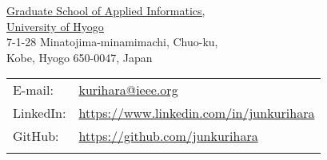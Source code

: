 {\Huge \name}


\vspace{0.25in}

\begin{minipage}{0.45\linewidth}
  \href{https://www.ai.u-hyogo.ac.jp/index.html}{Graduate School of Applied Informatics,\\ University of Hyogo} \\
  7-1-28 Minatojima-minamimachi, Chuo-ku, \\
  Kobe, Hyogo 650-0047, Japan
\end{minipage}
\begin{minipage}{0.45\linewidth}
  \begin{tabular}{ll}
    E-mail: & \href{mailto:kurihara@ieee.org}{kurihara@ieee.org} \\
    LinkedIn: & \href{https://www.linkedin.com/in/junkurihara}{https://www.linkedin.com/in/junkurihara}\\
    GitHub: & \href{https://github.com/junkurihara}{https://github.com/junkurihara}\\
    &\\
  \end{tabular}
\end{minipage}
